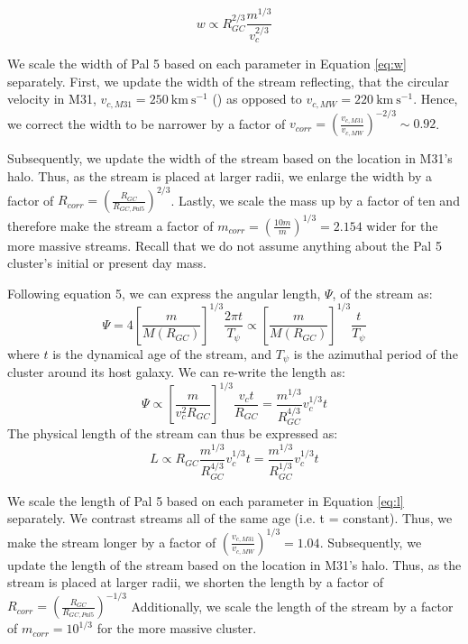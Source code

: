 \documentclass[twocolumn]{aastex62}
\newcommand{\kms}{\ensuremath{\textrm{km}~\textrm{s}^{-1}}}
\newcommand{\todo}[1]{{\color{red} TODO: #1}}
\begin{document}
\begin{equation}
\label{eq:w}
w \propto R_{GC}^{2/3} \frac{m^{1/3}}{v_c^{2/3}}
\end{equation}

We scale the width of Pal 5 based on each parameter in Equation \ref{eq:w} separately. First, we update the width of the stream reflecting, that the circular velocity in M31, $v_{c, M31}= 250 ~\kms$  (\citealt{chemin09}) as opposed to  $v_{c, MW}= 220 ~\kms$. Hence, we correct the width to be narrower by a factor of $v_{corr} =  \left(\frac{v_{c,M31}}{v_{c,MW}}\right)^{-2/3} \sim 0.92$. 

Subsequently, we update the width of the stream based on the location in M31's halo. Thus, as the stream is placed at larger radii, we enlarge the width by a factor of  $R_{corr} = \left(\frac{R_{GC}}{R_{GC,Pal5}}\right)^{2/3}$. Lastly, we scale the mass up by a factor of ten and therefore make the stream a factor of $m_{corr} = \left(\frac{10m}{m}\right)^{1/3}= 2.154$ wider for the more massive streams. Recall that we do not assume anything about the Pal 5 cluster's initial or present day mass. 


Following \citet{johnston01} equation 5, we can express the angular length, $\Psi$, of the stream as:
\begin{equation}
\Psi = 4  \left[\frac{m}{M(R_{GC})}\right]^{1/3}  \frac{2 \pi t}{T_{\psi}} \propto \left[\frac{m}{M(R_{GC})}\right]^{1/3}  \frac{t}{T_{\psi}}
\end{equation}
where $t$ is the dynamical age of the stream, and $T_{\psi}$ is the azimuthal period of the cluster around its host galaxy. We can re-write the length as:
\begin{equation}
\Psi \propto \left[\frac{m }{v_c^2 R_{GC}}\right]^{1/3}  \frac{v_c t }{R_{GC}} = \frac{m^{1/3}}{R_{GC}^{4/3}} v_c^{1/3}t
\end{equation}
The physical length of the stream can thus be expressed as:
\begin{equation}
\label{eq:l}
L \propto R_{GC} \frac{m^{1/3}}{R_{GC}^{4/3}} v_c^{1/3}t = \frac{m^{1/3}}{R_{GC}^{1/3}} v_c^{1/3}t
\end{equation}

We scale  the length of Pal 5 based on each parameter in Equation \ref{eq:l} separately. We contrast streams all of the same age (i.e.  t = constant). Thus, we make the stream longer by a factor of $(\frac{v_{c,M31}}{v_{c,MW}})^{1/3} = 1.04$. Subsequently, we update the length of the stream based on the location in M31's halo. Thus, as the stream is placed at larger radii, we shorten the length by a factor of  $R_{corr} = \left(\frac{R_{GC}}{R_{GC,Pal5}}\right)^{-1/3}$ %
Additionally, we scale the length of the stream by a factor of $m_{corr} = 10^{1/3}$ for the more massive cluster. 
\end{document}
